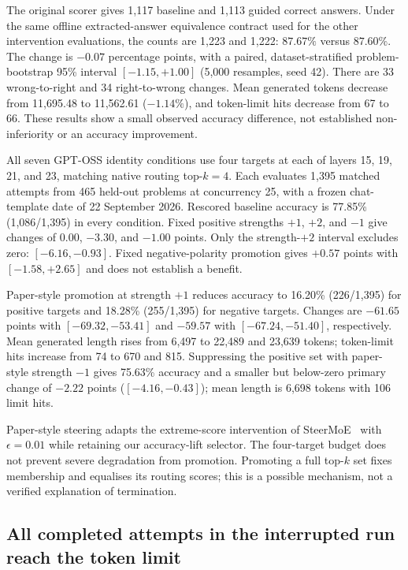 \documentclass[12pt,a4paper,twoside,openright]{book}
\begin{document}
The original scorer gives 1,117 baseline and 1,113 guided correct answers.
Under the same offline extracted-answer equivalence contract used for
the other intervention evaluations, the counts are 1,223 and 1,222:
$87.67\%$ versus $87.60\%$. The change is $-0.07$ percentage points,
with a paired, dataset-stratified problem-bootstrap 95\% interval
$[-1.15,+1.00]$ (5,000 resamples, seed 42). There are 33 wrong-to-right
and 34 right-to-wrong changes. Mean generated tokens decrease from
11,695.48 to 11,562.61 ($-1.14\%$), and token-limit hits decrease from
67 to 66. These results show a small observed accuracy difference,
not established non-inferiority or an accuracy improvement.

All seven GPT-OSS identity conditions use four targets at each of layers
15, 19, 21, and 23, matching native routing top-$k=4$. Each evaluates
1,395 matched attempts from 465 held-out problems at concurrency 25,
with a frozen chat-template date of 22 September 2026. Rescored baseline
accuracy is 77.85\% (1,086/1,395) in every condition.
Fixed positive strengths $+1$, $+2$, and $-1$ give changes of $0.00$,
$-3.30$, and $-1.00$ points. Only the strength-$+2$ interval excludes
zero: $[-6.16,-0.93]$. Fixed negative-polarity promotion gives $+0.57$
points with $[-1.58,+2.65]$ and does not establish a benefit.

Paper-style promotion at strength $+1$ reduces accuracy to 16.20\%
(226/1,395) for positive targets and 18.28\% (255/1,395) for negative
targets. Changes are $-61.65$ points with $[-69.32,-53.41]$ and
$-59.57$ with $[-67.24,-51.40]$, respectively. Mean generated length
rises from 6,497 to 22,489 and 23,639 tokens; token-limit hits increase
from 74 to 670 and 815. Suppressing the positive set with paper-style
strength $-1$ gives 75.63\% accuracy and a smaller but below-zero
primary change of $-2.22$ points ($[-4.16,-0.43]$); mean length is
6,698 tokens with 106 limit hits.

Paper-style steering adapts the extreme-score intervention of
SteerMoE~\cite{fayyaz2025steermoe} with $\epsilon=0.01$ while retaining our
accuracy-lift selector. The four-target budget does not prevent severe
degradation from promotion. Promoting a full top-$k$ set fixes membership and
equalises its routing scores; this is a possible mechanism, not a verified
explanation of termination.

\subsection{All completed attempts in the interrupted run reach the token limit}
\end{document}
